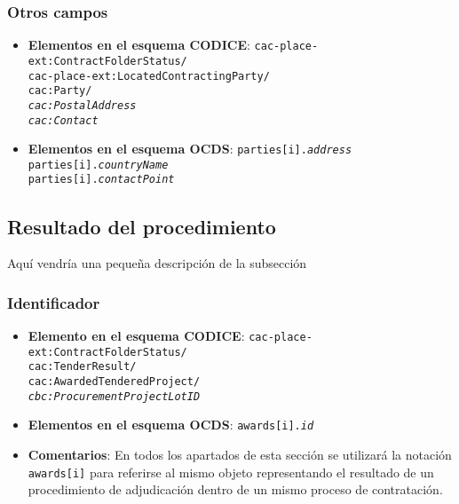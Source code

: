         \subsubsection{Otros campos}
            \begin{itemize}
                \item \textbf{Elementos en el esquema CODICE}:
                    \tabto{7.6cm} \texttt{cac-place-ext:ContractFolderStatus/} \\
                    \tabto{7.6cm} \texttt{cac-place-ext:LocatedContractingParty/} \\
                    \tabto{7.6cm} \texttt{cac:Party/} \\
                    \tabto{7.6cm} \texttt{\textit{cac:PostalAddress}} \\
                    \tabto{7.6cm} \texttt{\textit{cac:Contact}} \\
                \item \textbf{Elementos en el esquema OCDS}:
                    \tabto{7.6cm} \texttt{parties[i].\textit{address}} \\
                    \tabto{7.6cm} \texttt{parties[i].\textit{countryName}} \\
                    \tabto{7.6cm} \texttt{parties[i].\textit{contactPoint}}
            \end{itemize}
    
    \subsection{Resultado del procedimiento}
        
        Aquí vendría una pequeña descripción de la subsección
    
        \subsubsection{Identificador}
            \begin{itemize}
                \item \textbf{Elemento en el esquema CODICE}:
                    \tabto{7.6cm} \texttt{cac-place-ext:ContractFolderStatus/} \\
                    \tabto{7.6cm} \texttt{cac:TenderResult/} \\
                    \tabto{7.6cm} \texttt{cac:AwardedTenderedProject/} \\
                    \tabto{7.6cm} \texttt{\textit{cbc:ProcurementProjectLotID}}
                \item \textbf{Elementos en el esquema OCDS}:
                    \tabto{7.6cm} \texttt{awards[i].\textit{id}}
                \item \textbf{Comentarios}: En todos los apartados de esta sección se utilizará la notación \texttt{awards[i]} para referirse al mismo objeto representando el resultado de un procedimiento de adjudicación dentro de un mismo proceso de contratación.
            \end{itemize}
            

